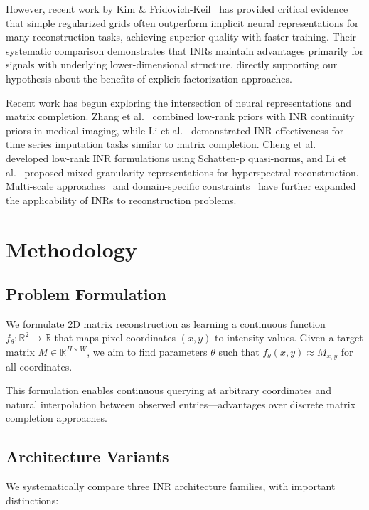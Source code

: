 \documentclass{article}
\begin{document}
However, recent work by Kim \& Fridovich-Keil~\cite{kim2025grids} has provided critical evidence that simple regularized grids often outperform implicit neural representations for many reconstruction tasks, achieving superior quality with faster training. Their systematic comparison demonstrates that INRs maintain advantages primarily for signals with underlying lower-dimensional structure, directly supporting our hypothesis about the benefits of explicit factorization approaches.

Recent work has begun exploring the intersection of neural representations and matrix completion. Zhang et al.~\cite{zhang2025lorein} combined low-rank priors with INR continuity priors in medical imaging, while Li et al.~\cite{li2025imputeinr} demonstrated INR effectiveness for time series imputation tasks similar to matrix completion. Cheng et al.~\cite{cheng2025lowrank} developed low-rank INR formulations using Schatten-p quasi-norms, and Li et al.~\cite{li2025mgir} proposed mixed-granularity representations for hyperspectral reconstruction. Multi-scale approaches~\cite{han2023nrff} and domain-specific constraints~\cite{rao2025cristal} have further expanded the applicability of INRs to reconstruction problems.

\section{Methodology}

\subsection{Problem Formulation}

We formulate 2D matrix reconstruction as learning a continuous function $f_\theta: \mathbb{R}^2 \rightarrow \mathbb{R}$ that maps pixel coordinates $(x, y)$ to intensity values. Given a target matrix $M \in \mathbb{R}^{H \times W}$, we aim to find parameters $\theta$ such that $f_\theta(x, y) \approx M_{x,y}$ for all coordinates.

This formulation enables continuous querying at arbitrary coordinates and natural interpolation between observed entries—advantages over discrete matrix completion approaches.

\subsection{Architecture Variants}

We systematically compare three INR architecture families, with important distinctions:
\end{document}

